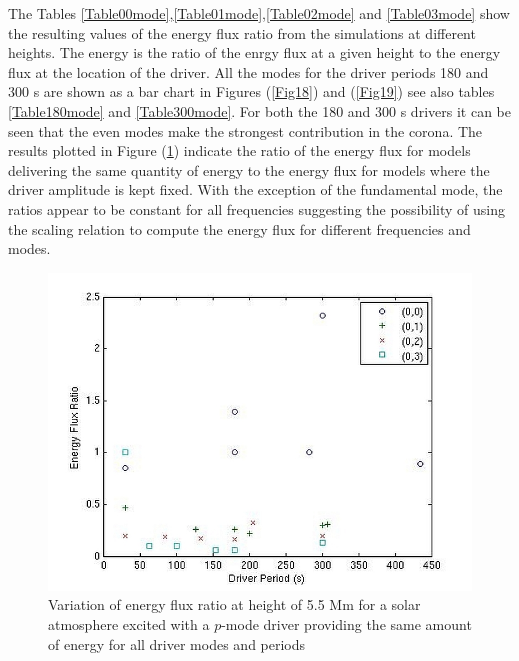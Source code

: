 \documentclass[preprint,authoryear,12pt]{elsarticle}
\begin{document}
The Tables \ref{Table00mode},\ref{Table01mode},\ref{Table02mode} and \ref{Table03mode} show the resulting values of the energy flux ratio from the simulations at different heights. The energy is the ratio of the enrgy flux at a given height to the energy flux at the location of the driver. All the modes for the driver periods 180 and 300 s are shown as a bar chart in Figures (\ref{Fig18}) and (\ref{Fig19}) see also tables \ref{Table180mode} and \ref{Table300mode}. For both the 180 and 300 s drivers it can be seen that the even modes make the strongest contribution in the corona. The results plotted in Figure (\ref{Fig20}) indicate the ratio of the energy flux for models delivering the same quantity of energy to the energy flux for models where the driver amplitude is kept fixed. With the exception of the fundamental mode, the ratios appear to be constant for all frequencies suggesting the possibility of using the scaling relation to compute the energy flux for different frequencies and modes.  
\begin{figure}[h]
\includegraphics[scale=3]{imrescale/ratio_varoverconst_eflux_vperiod_for_modes_5p5Mm.jpg}
\caption{Variation of energy flux ratio at height of 5.5 Mm for a solar atmosphere excited with a $p$-mode driver providing the same amount of energy for all driver modes and periods}
\label{Fig20}
\end{figure}
\end{document}
